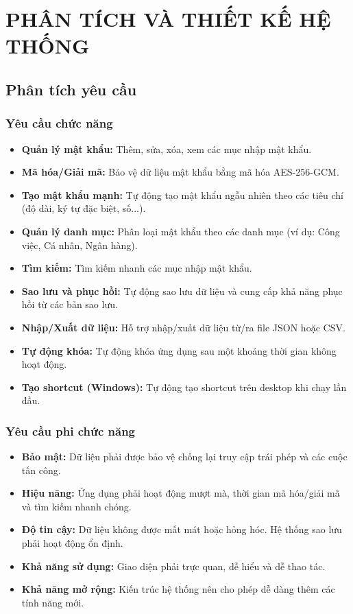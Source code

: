\chapter{PHÂN TÍCH VÀ THIẾT KẾ HỆ THỐNG}

\section{Phân tích yêu cầu}
\subsection{Yêu cầu chức năng}
\begin{itemize}
    \item \textbf{Quản lý mật khẩu:} Thêm, sửa, xóa, xem các mục nhập mật khẩu.
    \item \textbf{Mã hóa/Giải mã:} Bảo vệ dữ liệu mật khẩu bằng mã hóa AES-256-GCM.
    \item \textbf{Tạo mật khẩu mạnh:} Tự động tạo mật khẩu ngẫu nhiên theo các tiêu chí (độ dài, ký tự đặc biệt, số...).
    \item \textbf{Quản lý danh mục:} Phân loại mật khẩu theo các danh mục (ví dụ: Công việc, Cá nhân, Ngân hàng).
    \item \textbf{Tìm kiếm:} Tìm kiếm nhanh các mục nhập mật khẩu.
    \item \textbf{Sao lưu và phục hồi:} Tự động sao lưu dữ liệu và cung cấp khả năng phục hồi từ các bản sao lưu.
    \item \textbf{Nhập/Xuất dữ liệu:} Hỗ trợ nhập/xuất dữ liệu từ/ra file JSON hoặc CSV.
    \item \textbf{Tự động khóa:} Tự động khóa ứng dụng sau một khoảng thời gian không hoạt động.
    \item \textbf{Tạo shortcut (Windows):} Tự động tạo shortcut trên desktop khi chạy lần đầu.
\end{itemize}

\subsection{Yêu cầu phi chức năng}
\begin{itemize}
    \item \textbf{Bảo mật:} Dữ liệu phải được bảo vệ chống lại truy cập trái phép và các cuộc tấn công.
    \item \textbf{Hiệu năng:} Ứng dụng phải hoạt động mượt mà, thời gian mã hóa/giải mã và tìm kiếm nhanh chóng.
    \item \textbf{Độ tin cậy:} Dữ liệu không được mất mát hoặc hỏng hóc. Hệ thống sao lưu phải hoạt động ổn định.
    \item \textbf{Khả năng sử dụng:} Giao diện phải trực quan, dễ hiểu và dễ thao tác.
    \item \textbf{Khả năng mở rộng:} Kiến trúc hệ thống nên cho phép dễ dàng thêm các tính năng mới.
\end{itemize}

